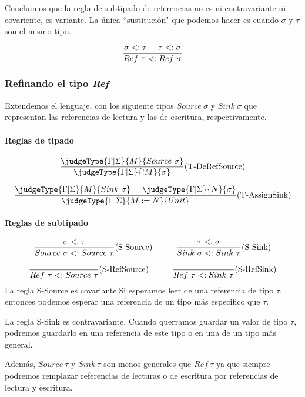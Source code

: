 Concluimos que la regla de subtipado de referencias no es ni contravariante ni covariente, es variante. La única ``sustitución" que podemos hacer es cuando $\sigma$ y $\tau$ son el mismo tipo.

$$\frac{\sigma <: \tau\hspace*{5mm} \tau <: \sigma}{Ref~\tau <: Ref~\sigma}$$

\subsubsection{Refinando el tipo \texorpdfstring{\textit{Ref}}{Ref}}
Extendemos el lenguaje, con los siguiente tipos $Source~\sigma$ y $Sink~\sigma$ que representan las referencias de lectura y las de escritura, respectivamente. 

\paragraph{Reglas de tipado}

\begin{align*}
\frac{\judgeType{\Gamma|\Sigma}{M}{Source~\sigma}}{\judgeType{\Gamma|\Sigma}{!M}{\sigma}}(\text{T-DeRefSource})
\end{align*}

\begin{align*}
\frac{\judgeType{\Gamma|\Sigma}{M}{Sink~\sigma}\hspace*{5mm} \judgeType{\Gamma|\Sigma}{N}{\sigma}}{\judgeType{\Gamma|\Sigma}{M := N}{Unit}}(\text{T-AssignSink})
\end{align*}

\paragraph{Reglas de subtipado}
\begin{align*}
\frac{\sigma <: \tau}{Source~\sigma <: Source~\tau}(\text{S-Source})\hspace*{1cm}\frac{\tau <: \sigma}{Sink~\sigma <: Sink~\tau}(\text{S-Sink})
\end{align*}

\begin{align*}
\frac{}{Ref~\tau <: Source~\tau}(\text{S-RefSource})\hspace*{1cm}\frac{}{Ref~\tau <: Sink~\tau}(\text{S-RefSink})
\end{align*}
La regla S-Source es covariante.Si esperamos leer de una referencia de tipo $\tau$, entonces podemos esperar una referencia de un tipo más especifico que $\tau$. 

La regla S-Sink es contravariante. Cuando querramos guardar un valor de tipo $\tau$, podremos guardarlo en una referencia de este tipo o en una de un tipo más general.

Además, $Source~\tau$ y $Sink~\tau$ son menos generales que $Ref~\tau$ ya que siempre podremos remplazar referencias de lecturas o de escritura por referencias de lectura y escritura.